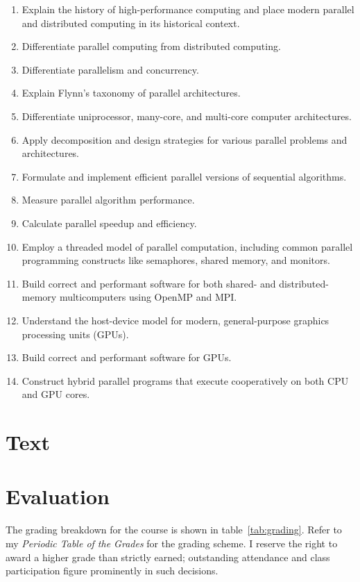 \documentclass[11pt]{article}
\begin{document}
\begin{enumerate}
\item Explain the history of high-performance computing
  and place modern parallel and distributed computing
  in its historical context.
\item Differentiate parallel computing
  from distributed computing.
\item Differentiate parallelism and concurrency.
\item Explain Flynn's taxonomy of parallel architectures.
\item Differentiate uniprocessor, many-core, and multi-core computer architectures.
\item Apply decomposition and design strategies
  for various parallel problems and architectures.
\item Formulate and implement efficient parallel versions of sequential algorithms.
\item Measure parallel algorithm performance.
\item Calculate parallel speedup and efficiency.
\item Employ a threaded model of parallel computation,
  including common parallel programming constructs
  like semaphores, shared memory, and monitors.
\item Build correct and performant software
  for both shared- and distributed-memory multicomputers
  using OpenMP and MPI.
\item Understand the host-device model
  for modern, general-purpose graphics processing units (GPUs).
\item Build correct and performant software for GPUs.
\item Construct hybrid parallel programs
  that execute cooperatively on both CPU and GPU cores.
\end{enumerate}

\section{Text}



\section{Evaluation}

The grading breakdown
for the course
is shown in table~\ref{tab:grading}.
Refer to my \emph{Periodic Table of the Grades} for the grading scheme.
I reserve the right to award a higher grade than strictly earned;
outstanding attendance and class participation
figure prominently in such decisions.
\end{document}
